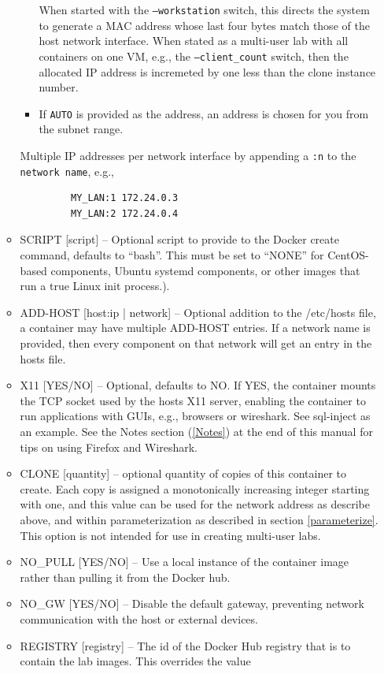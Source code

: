 \documentclass[12pt]{article}
\begin{document}
\begin{itemize}
\begin{itemize}
\begin{itemize}
When started with the {\tt --workstation} switch, this directs the system to generate a MAC address whose last four bytes match 
those of the host network interface.  When stated as a multi-user lab with all containers on one VM, e.g., the 
{\tt --client\_count} switch, then the allocated IP address is incremeted by one less than the clone instance number.
\item If {\tt AUTO} is provided as the address, an address is chosen for you from the subnet range.  
\end{itemize}
Multiple IP addresses per network interface by appending a {\tt :n} to the {\tt network name}, e.g., 
\begin{verbatim}
         MY_LAN:1 172.24.0.3
         MY_LAN:2 172.24.0.4
\end{verbatim}
\item SCRIPT [script] -- Optional script to provide to the Docker create command, defaults to ``bash''.  This must be set to
``NONE'' for CentOS-based components, Ubuntu systemd components, or other images that run a true Linux init process.).
\item ADD-HOST [host:ip | network] -- Optional addition to the /etc/hosts file, a container may have multiple ADD-HOST entries.
If a network name is provided, then every component on that network will get an entry in the hosts file.
\item X11 [YES/NO] -- Optional, defaults to NO.  If YES, the container mounts the TCP socket used by the hosts X11 server,
enabling the container to run applications with GUIs, e.g., browsers or wireshark.  See sql-inject as an example.  See the
Notes section (\ref{Notes}) at the end of this manual for tips on using Firefox and Wireshark.
\item CLONE [quantity] -- optional quantity of copies of this container to create. Each copy is assigned a monotonically
increasing integer starting with one, and this value can be used for the network address as describe above, and within
parameterization as described in section \ref{parameterize}. This option is not intended for use in creating multi-user
labs.
\item NO\_PULL [YES/NO] -- Use a local instance of the container image rather than pulling it from the Docker hub.
\item NO\_GW [YES/NO] -- Disable the default gateway, preventing network communication with the host or external devices.
\item REGISTRY [registry] -- The id of the Docker Hub registry that is to contain the lab images. This overrides the value

\end{itemize}
\end{itemize}
\end{document}
